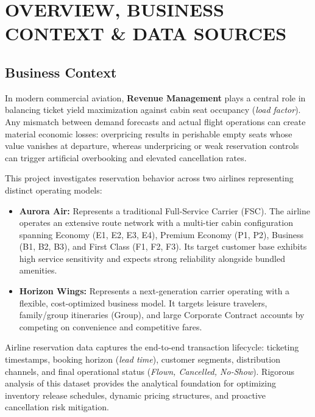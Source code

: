 \documentclass[12pt, a4paper]{report}
\newcommand{\airline}[1]{\textbf{\textsf{#1}}}
\begin{document}
\tableofcontents
\clearpage

\chapter{OVERVIEW, BUSINESS CONTEXT \& DATA SOURCES}

\section{Business Context}

In modern commercial aviation, \textbf{Revenue Management} plays a central role in balancing ticket yield maximization against cabin seat occupancy (\textit{load factor}). Any mismatch between demand forecasts and actual flight operations can create material economic losses: overpricing results in perishable empty seats whose value vanishes at departure, whereas underpricing or weak reservation controls can trigger artificial overbooking and elevated cancellation rates.

This project investigates reservation behavior across two airlines representing distinct operating models:

\begin{itemize}
  \item \airline{Aurora Air:} Represents a traditional Full-Service Carrier (FSC). The airline operates an extensive route network with a multi-tier cabin configuration spanning Economy (E1, E2, E3, E4), Premium Economy (P1, P2), Business (B1, B2, B3), and First Class (F1, F2, F3). Its target customer base exhibits high service sensitivity and expects strong reliability alongside bundled amenities.

  \item \airline{Horizon Wings:} Represents a next-generation carrier operating with a flexible, cost-optimized business model. It targets leisure travelers, family/group itineraries (Group), and large Corporate Contract accounts by competing on convenience and competitive fares.
\end{itemize}

Airline reservation data captures the end-to-end transaction lifecycle: ticketing timestamps, booking horizon (\textit{lead time}), customer segments, distribution channels, and final operational status (\textit{Flown, Cancelled, No-Show}). Rigorous analysis of this dataset provides the analytical foundation for optimizing inventory release schedules, dynamic pricing structures, and proactive cancellation risk mitigation.
\end{document}
